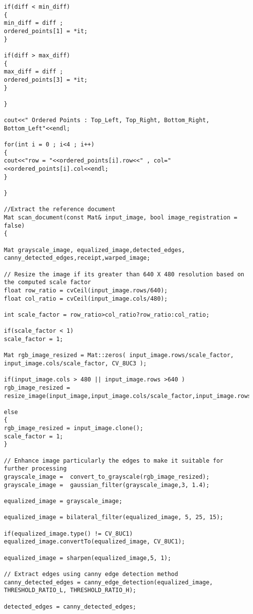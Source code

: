 \begin{lstlisting}
if(diff < min_diff)
{
min_diff = diff ;
ordered_points[1] = *it;
}

if(diff > max_diff)
{
max_diff = diff ;
ordered_points[3] = *it;
}

}

cout<<" Ordered Points : Top_Left, Top_Right, Bottom_Right, Bottom_Left"<<endl;

for(int i = 0 ; i<4 ; i++)
{
cout<<"row = "<<ordered_points[i].row<<" , col="<<ordered_points[i].col<<endl;
}	

}

//Extract the reference document
Mat scan_document(const Mat& input_image, bool image_registration = false)
{

Mat grayscale_image, equalized_image,detected_edges, canny_detected_edges,receipt,warped_image;

// Resize the image if its greater than 640 X 480 resolution based on the computed scale factor	 
float row_ratio = cvCeil(input_image.rows/640);
float col_ratio = cvCeil(input_image.cols/480);

int scale_factor = row_ratio>col_ratio?row_ratio:col_ratio;

if(scale_factor < 1)
scale_factor = 1;

Mat rgb_image_resized = Mat::zeros( input_image.rows/scale_factor, input_image.cols/scale_factor, CV_8UC3 );

if(input_image.cols > 480 || input_image.rows >640 )
rgb_image_resized = resize_image(input_image,input_image.cols/scale_factor,input_image.rows/scale_factor);

else
{
rgb_image_resized = input_image.clone();
scale_factor = 1;
}

// Enhance image particularly the edges to make it suitable for further processing	 
grayscale_image =  convert_to_grayscale(rgb_image_resized);
grayscale_image =  gaussian_filter(grayscale_image,3, 1.4);

equalized_image = grayscale_image; 

equalized_image = bilateral_filter(equalized_image, 5, 25, 15);

if(equalized_image.type() != CV_8UC1)
equalized_image.convertTo(equalized_image, CV_8UC1);

equalized_image = sharpen(equalized_image,5, 1);

// Extract edges using canny edge detection method
canny_detected_edges = canny_edge_detection(equalized_image, THRESHOLD_RATIO_L, THRESHOLD_RATIO_H);

detected_edges = canny_detected_edges;


\end{lstlisting}
